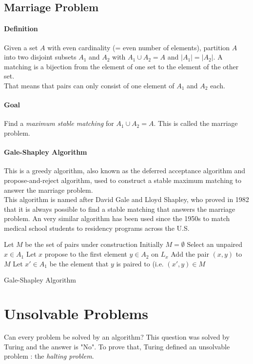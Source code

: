 \documentclass[10pt,a4paper]{book}
\newcommand{\ind}{\hspace*{\parindent}}
\begin{document}
\subsection{Marriage Problem}
\paragraph*{Definition}
Given a set $A$ with even cardinality (= even number of elements), partition $A$ into two disjoint subsets $A_1$ and $A_2$ with $A_1 \cup A_2 = A$ and $|A_1| = |A_2|$. A matching is a bijection from the element of one set to the element of the other set.\\
That means that pairs can only consist of one element of $A_1$ and $A_2$ each.
\paragraph*{Goal}
Find a \textit{maximum stable matching} for $A_1 \cup A_2 = A$. This is called the marriage problem.
\paragraph*{Gale-Shapley Algorithm}
This is a greedy algorithm, also known as the deferred acceptance algorithm and propose-and-reject algorithm, used to construct a stable maximum matching to answer the marriage problem. \\
\ind This algorithm is named after David Gale and Lloyd Shapley, who proved in 1982 that it is always possible to find a stable matching that answers the marriage problem. An very similar algorithm has been used since the 1950s to match medical school students to residency programs across the U.S.
\begin{algorithm}
\DontPrintSemicolon
Let $M$ be the set of pairs under construction\;
Initially $M = \emptyset$\;
{Select an unpaired $x \in A_1$\;
Let $x$ propose to the first element $y \in A_2$ on $L_x$\;
{Add the pair $(x,y)$ to $M$}
{Let $x' \in A_1$ be the element that $y$ is paired to (i.e. $(x',y) \in M$\;
}}
\caption{Gale-Shapley Algorithm}
\end{algorithm}

\section{Unsolvable Problems}
Can every problem be solved by an algorithm? This question was solved by Turing and the answer is "No". To prove that, Turing defined an unsolvable problem : the \textit{halting problem}.
\end{document}
